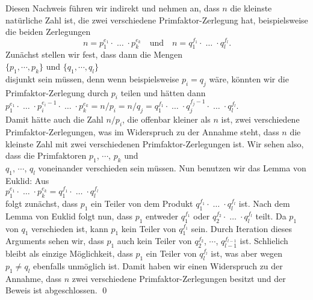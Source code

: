 Diesen Nachweis f\"{u}hren wir indirekt und nehmen an, dass $n$ die kleinste nat\"{u}rliche Zahl ist, die
zwei verschiedene Primfaktor-Zerlegung hat, beispielsweise die beiden Zerlegungen
\begin{equation}
  \label{eq:hauptsatz-arithmetik1}
n = p_1^{e_1} \cdot \;\dots\; \cdot p_k^{e_k} \quad \mbox{und} \quad
n = q_1^{f_1} \cdot \;\dots\; \cdot q_l^{f_l}.  
\end{equation}
Zun\"{a}chst stellen wir fest, dass dann die Mengen
\\[0.2cm]
\hspace*{1.3cm}
$\{p_1, \cdots, p_k\}$ \quad und \quad
$\{q_1, \cdots, q_l\}$ 
\\[0.2cm]
disjunkt sein m\"{u}ssen, denn wenn beispielsweise $p_i = q_j$ w\"{a}re, k\"{o}nnten wir die
Primfaktor-Zerlegung durch $p_i$ teilen und h\"{a}tten dann
\\[0.2cm]
\hspace*{1.3cm}
$p_1^{e_1} \cdot \;\dots\; \cdot p_i^{e_i-1} \cdot \;\dots\; \cdot p_k^{e_k} = n/p_i = n/q_j
 = q_1^{f_1} \cdot \;\dots\; \cdot q_j^{f_j-1} \cdot \;\dots\; \cdot q_l^{f_l}$.
\\[0.2cm]
Damit h\"{a}tte auch die Zahl $n/p_i$, die offenbar kleiner als $n$ ist, zwei verschiedene
Primfaktor-Zerlegungen, was im Widerspruch zu 
der Annahme steht, dass $n$ die kleinste Zahl mit zwei verschiedenen Primfaktor-Zerlegungen ist.
Wir sehen also, dass die Primfaktoren $p_1$, $\cdots$, $p_k$ und \\ $q_1$, $\cdots$, $q_l$ 
voneinander verschieden sein m\"{u}ssen.  Nun benutzen wir das Lemma von Euklid:  
Aus 
\\[0.2cm]
\hspace*{1.3cm}
$p_1^{e_1} \cdot \;\dots\; \cdot p_k^{e_k} = q_1^{f_1} \cdot \;\dots\; \cdot q_l^{f_l}$
\\[0.2cm]
folgt zun\"{a}chst, dass $p_1$ ein Teiler von dem Produkt $q_1^{f_1} \cdot \;\dots\; \cdot q_l^{f_l}$ ist.
Nach dem Lemma von Euklid folgt nun, dass $p_1$ entweder $q_1^{f_1}$ oder 
$q_2^{f_2} \cdot \;\dots\; \cdot q_l^{f_l}$ teilt.  Da $p_1$ von $q_1$ verschieden ist, kann $p_1$ kein
Teiler von $q_1^{f_1}$ sein.  Durch Iteration dieses Arguments sehen wir, dass $p_1$ auch kein
Teiler von $q_2^{f_2}$, $\cdots$, $q_{l-1}^{f_{l-1}}$ ist.  Schlie\3lich bleibt als einzige
M\"{o}glichkeit,  dass $p_1$ ein Teiler von
 $q_l^{f_l}$ ist, was aber wegen $p_1 \not= q_l$ ebenfalls unm\"{o}glich ist.
Damit haben wir einen Widerspruch zu der Annahme, dass $n$
zwei verschiedene Primfaktor-Zerlegungen besitzt und der Beweis ist abgeschlossen.
\qed


